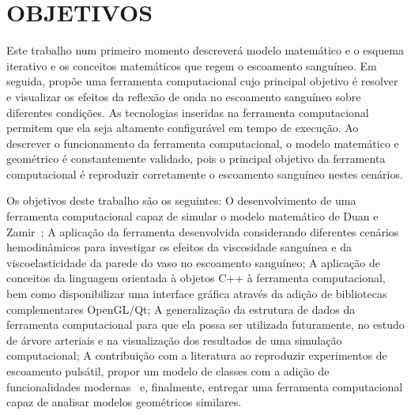 
\section{OBJETIVOS}\label{sec:obj}

Este trabalho num primeiro momento descreverá modelo matemático e o esquema iterativo e os conceitos matemáticos que regem o escoamento sanguíneo. Em seguida, propõe uma ferramenta computacional cujo principal objetivo é resolver e visualizar os efeitos da reflexão de onda no escoamento sanguíneo sobre diferentes condições. As tecnologias inseridas na ferramenta computacional permitem que ela seja altamente configurável em tempo de execução. Ao descrever o funcionamento da ferramenta computacional, o modelo matemático e geométrico é constantemente validado, pois o principal objetivo da ferramenta computacional é reproduzir corretamente o escoamento sanguíneo nestes cenários.

Os objetivos deste trabalho são os seguintes: O desenvolvimento de uma ferramenta computacional capaz de simular o modelo matemático de Duan e Zamir~\cite{Duan}; A aplicação da ferramenta desenvolvida considerando diferentes cenários hemodinâmicos para investigar os efeitos da viscosidade sanguínea e da viscoelasticidade da parede do vaso no escoamento sanguíneo; A aplicação de conceitos da linguagem orientada à objetos C++ à ferramenta computacional, bem como disponibilizar uma interface gráfica através da adição de bibliotecas complementares OpenGL/Qt; A generalização da estrutura de dados da ferramenta computacional para que ela possa ser utilizada futuramente, no estudo de árvore arteriais e na visualização dos resultados de uma simulação computacional; A contribuição com a literatura ao reproduzir experimentos de escoamento pulsátil, propor um modelo de classes com a adição de funcionalidades modernas~\cite{factorypattern,QTClasses} e, finalmente, entregar uma ferramenta computacional capaz de analisar modelos geométricos similares.

